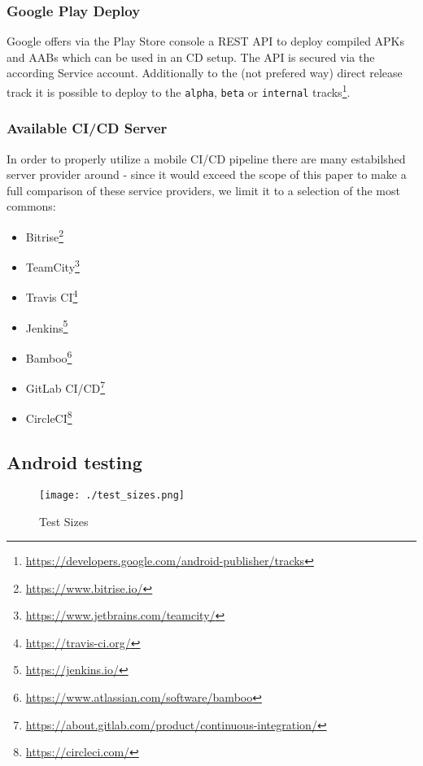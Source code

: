 \subsubsection{Google Play Deploy}
Google offers via the Play Store console a REST API to deploy compiled APKs and AABs which can be used in an CD setup. The API is secured via the according Service account. Additionally to the (not prefered way) direct release track it is possible to deploy to the \texttt{alpha}, \texttt{beta} or \texttt{internal} tracks\footnote{\url{https://developers.google.com/android-publisher/tracks}}.

\subsubsection{Available CI/CD Server}

In order to properly utilize a mobile CI/CD pipeline there are many estabilshed server provider around - since it would exceed the scope of this paper to make a full comparison of these service providers, we limit it to a selection of the most commons:

\begin{itemize}
	\item Bitrise\footnote{\url{https://www.bitrise.io/}}
	\item TeamCity\footnote{\url{https://www.jetbrains.com/teamcity/}}
	\item Travis CI\footnote{\url{https://travis-ci.org/}}
	\item Jenkins\footnote{\url{https://jenkins.io/}}
	\item Bamboo\footnote{\url{https://www.atlassian.com/software/bamboo}}
	\item GitLab CI/CD\footnote{\url{https://about.gitlab.com/product/continuous-integration/}}
	\item CircleCI\footnote{\url{https://circleci.com/}}
\end{itemize}

\subsection{Android testing}

\begin{figure}[htb]
	\centering
	\texttt{[image: ./test\_sizes.png]}
	\caption[Test Sizes]{Test Sizes\footnotemark}
	\label{fig_google_test_sizes}
\end{figure}

